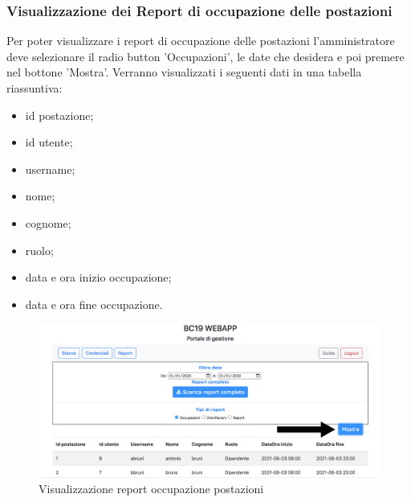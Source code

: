 \subsubsection{Visualizzazione dei Report di occupazione delle postazioni}
Per poter visualizzare i report di occupazione delle postazioni l'amministratore deve selezionare il radio button 'Occupazioni', le date che desidera e poi premere nel bottone 'Mostra'.
Verranno visualizzati i seguenti dati in una tabella riassuntiva:
\begin{itemize}
\item id postazione;
\item id utente;
\item username;
\item nome;
\item cognome;
\item ruolo;
\item data e ora inizio occupazione;
\item data e ora fine occupazione.
\end{itemize}
\begin{figure}[H]
	\centering
	\includegraphics[width=15cm]{res/images/bottoneReportO.png}
	\caption{Visualizzazione report occupazione postazioni}
\end{figure}

